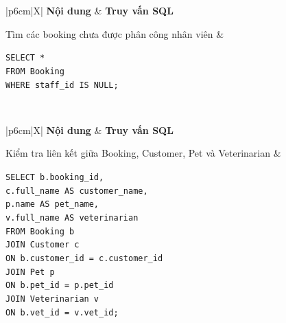 \begin{table}[htbp]
    \centering
    \caption{Kiểm thử giá trị NULL}
    \label{tab:test_null}
    \begin{tabularx}{\textwidth}{|p{6cm}|X|}
        \hline
        \textbf{Nội dung} & \textbf{Truy vấn SQL} \\ \hline

        Tìm các booking chưa được phân công nhân viên &
        \begin{minipage}[t]{\linewidth}
        \texttt{SELECT *}\\
        \texttt{FROM Booking}\\
        \texttt{WHERE staff\_id IS NULL;}
        \end{minipage}
        \\ \hline

    \end{tabularx}
\end{table}

\begin{table}[htbp]
    \centering
    \caption{Kiểm thử quan hệ giữa các bảng}
    \label{tab:test_relationship}
    \begin{tabularx}{\textwidth}{|p{6cm}|X|}
        \hline
        \textbf{Nội dung} & \textbf{Truy vấn SQL} \\ \hline

        Kiểm tra liên kết giữa Booking, Customer, Pet và Veterinarian &
        \begin{minipage}[t]{\linewidth}
        \texttt{SELECT b.booking\_id,}\\
        \texttt{c.full\_name AS customer\_name,}\\
        \texttt{p.name AS pet\_name,}\\
        \texttt{v.full\_name AS veterinarian}\\
        \texttt{FROM Booking b}\\
        \texttt{JOIN Customer c}\\
        \texttt{ON b.customer\_id = c.customer\_id}\\
        \texttt{JOIN Pet p}\\
        \texttt{ON b.pet\_id = p.pet\_id}\\
        \texttt{JOIN Veterinarian v}\\
        \texttt{ON b.vet\_id = v.vet\_id;}
        \end{minipage}
        \\ \hline

    \end{tabularx}
\end{table}

